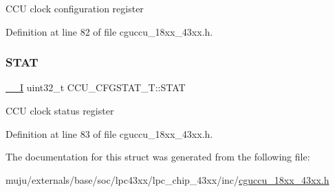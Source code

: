 C\+CU clock configuration register 

Definition at line 82 of file cguccu\+\_\+18xx\+\_\+43xx.\+h.

\mbox{\label{struct_c_c_u___c_f_g_s_t_a_t___t_a626b3e2c80c99a80389c779dfb958e45}} 
\subsubsection{\texorpdfstring{S\+T\+AT}{STAT}}
{\footnotesize\ttfamily \hyperlink{core__sc300_8h_af63697ed9952cc71e1225efe205f6cd3}{\+\_\+\+\_\+I} uint32\+\_\+t C\+C\+U\+\_\+\+C\+F\+G\+S\+T\+A\+T\+\_\+\+T\+::\+S\+T\+AT}

C\+CU clock status register 

Definition at line 83 of file cguccu\+\_\+18xx\+\_\+43xx.\+h.



The documentation for this struct was generated from the following file\+:\begin{DoxyCompactItemize}
\item 
muju/externals/base/soc/lpc43xx/lpc\+\_\+chip\+\_\+43xx/inc/\hyperlink{cguccu__18xx__43xx_8h}{cguccu\+\_\+18xx\+\_\+43xx.\+h}\end{DoxyCompactItemize}
